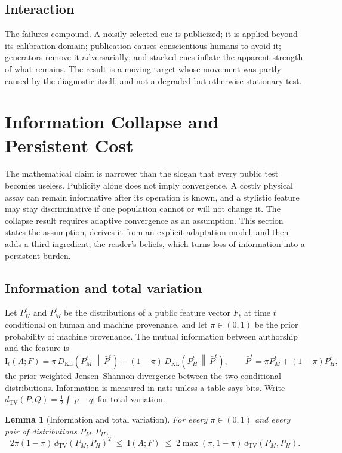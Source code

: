 \documentclass[11pt]{article}
\theoremstyle{plain}
\newtheorem{lemma}{Lemma}
\theoremstyle{definition}
\theoremstyle{remark}
\newcommand{\KL}{D_{\mathrm{KL}}}
\newcommand{\TV}{d_{\mathrm{TV}}}
\newcommand{\I}{\mathrm{I}}
\begin{document}
\subsection{Interaction}

The failures compound. A noisily selected cue is publicized; it is applied beyond its calibration domain; publication causes conscientious humans to avoid it; generators remove it adversarially; and stacked cues inflate the apparent strength of what remains. The result is a moving target whose movement was partly caused by the diagnostic itself, and not a degraded but otherwise stationary test.

\section{Information Collapse and Persistent Cost}\label{sec:collapse}

The mathematical claim is narrower than the slogan that every public test becomes useless. Publicity alone does not imply convergence. A costly physical assay can remain informative after its operation is known, and a stylistic feature may stay discriminative if one population cannot or will not change it. The collapse result requires adaptive convergence as an assumption. This section states the assumption, derives it from an explicit adaptation model, and then adds a third ingredient, the reader's beliefs, which turns loss of information into a persistent burden.

\subsection{Information and total variation}

Let $P_H^t$ and $P_M^t$ be the distributions of a public feature vector $F_t$ at time $t$ conditional on human and machine provenance, and let $\pi\in(0,1)$ be the prior probability of machine provenance. The mutual information between authorship and the feature is
\[
\I_t(A;F)
=
\pi\,\KL\!\left(P_M^t\,\middle\|\,\bar P^t\right)
+(1-\pi)\,\KL\!\left(P_H^t\,\middle\|\,\bar P^t\right),
\qquad
\bar P^t=\pi P_M^t+(1-\pi)P_H^t,
\]
the prior-weighted Jensen--Shannon divergence between the two conditional distributions. Information is measured in nats unless a table says bits. Write $\TV(P,Q)=\tfrac12\int|p-q|$ for total variation.

\begin{lemma}[Information and total variation]\label{lem:tv}
For every $\pi\in(0,1)$ and every pair of distributions $P_M,P_H$,
\[
2\pi(1-\pi)\,\TV(P_M,P_H)^2
\;\le\;
\I(A;F)
\;\le\;
2\max(\pi,1-\pi)\,\TV(P_M,P_H).
\]
\end{lemma}
\end{document}
